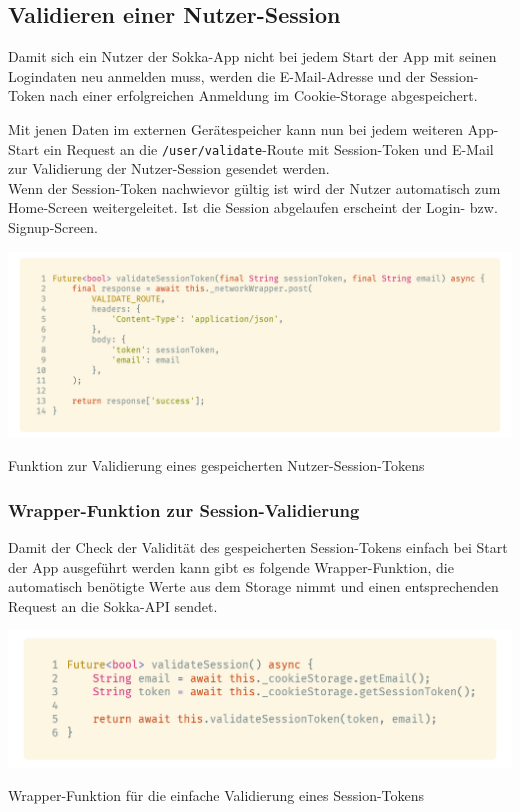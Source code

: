 \subsection{Validieren einer Nutzer-Session}

Damit sich ein Nutzer der Sokka-App nicht bei jedem Start der App mit seinen Logindaten neu
anmelden muss, werden die E-Mail-Adresse und der Session-Token nach einer erfolgreichen Anmeldung
im Cookie-Storage abgespeichert.

Mit jenen Daten im externen Gerätespeicher kann nun bei jedem weiteren App-Start ein Request an die
\lstinline{/user/validate}-Route mit Session-Token und E-Mail zur Validierung der Nutzer-Session
gesendet werden.\\
Wenn der Session-Token nachwievor gültig ist wird der Nutzer automatisch zum Home-Screen weitergeleitet.
Ist die Session abgelaufen erscheint der Login- bzw. Signup-Screen.

\begin{code}
    \centering
    \includegraphics[width=1\textwidth]{images/Client/services/user-auth/validate.png}
    \vspace{-25pt}
    \caption{Funktion zur Validierung eines gespeicherten Nutzer-Session-Tokens}
\end{code}

\subsubsection{Wrapper-Funktion zur Session-Validierung}

Damit der Check der Validität des gespeicherten Session-Tokens einfach
bei Start der App ausgeführt werden kann gibt es folgende Wrapper-Funktion,
die automatisch benötigte Werte aus dem Storage nimmt und einen entsprechenden
Request an die Sokka-API sendet.

\begin{code}
    \centering
    \includegraphics[width=1\textwidth]{images/Client/services/user-auth/validateSession.png}
    \vspace{-25pt}
    \caption{Wrapper-Funktion für die einfache Validierung eines Session-Tokens}
\end{code}